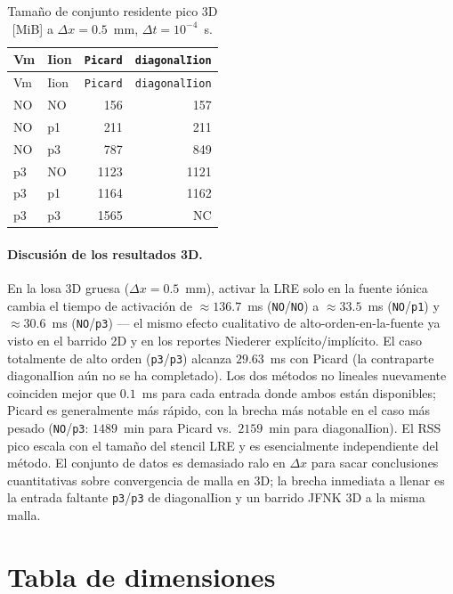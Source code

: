 \documentclass[11pt,a4paper]{article}
\newcommand{\code}[1]{\texttt{\small #1}}
\begin{document}
\begin{center}\footnotesize
\begin{longtable}{llrr}
\caption{Tamaño de conjunto residente pico 3D [MiB] a $\Delta x = 0.5$~mm,
$\Delta t = 10^{-4}$~s.}\\
\toprule
Vm & Iion & \code{Picard} & \code{diagonalIion} \\
\midrule\endfirsthead\toprule
Vm & Iion & \code{Picard} & \code{diagonalIion} \\
\midrule\endhead
NO & NO &  156 &  157 \\
NO & p1 &  211 &  211 \\
NO & p3 &  787 &  849 \\
p3 & NO & 1123 & 1121 \\
p3 & p1 & 1164 & 1162 \\
p3 & p3 & 1565 & NC   \\
\bottomrule\end{longtable}\end{center}

\paragraph{Discusión de los resultados 3D.}
En la losa 3D gruesa ($\Delta x = 0.5$~mm), activar la LRE solo en la fuente iónica
cambia el tiempo de activación de $\approx 136.7$~ms (\code{NO}/\code{NO}) a
$\approx 33.5$~ms (\code{NO}/\code{p1}) y $\approx 30.6$~ms (\code{NO}/\code{p3}) ---
el mismo efecto cualitativo de alto-orden-en-la-fuente ya visto en el barrido 2D y en
los reportes Niederer explícito/implícito. El caso totalmente de alto orden
(\code{p3}/\code{p3}) alcanza $29.63$~ms con Picard (la contraparte diagonalIion aún
no se ha completado). Los dos métodos no lineales nuevamente coinciden mejor que
$0.1$~ms para cada entrada donde ambos están disponibles; Picard es generalmente más
rápido, con la brecha más notable en el caso más pesado (\code{NO}/\code{p3}:
$1489$~min para Picard vs.\ $2159$~min para diagonalIion). El RSS pico escala con el
tamaño del stencil LRE y es esencialmente independiente del método. El conjunto de
datos es demasiado ralo en $\Delta x$ para sacar conclusiones cuantitativas sobre
convergencia de malla en 3D; la brecha inmediata a llenar es la entrada faltante
\code{p3}/\code{p3} de diagonalIion y un barrido JFNK 3D a la misma malla.

\appendix
\section{Tabla de dimensiones}
\end{document}
